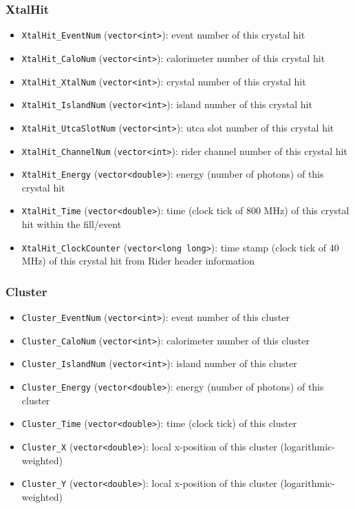 \subsubsection*{XtalHit}
\begin{itemize}
\item \verb+XtalHit_EventNum+ (\verb+vector<int>+): event number of this crystal hit
\item \verb+XtalHit_CaloNum+ (\verb+vector<int>+): calorimeter number of this crystal hit
\item \verb+XtalHit_XtalNum+ (\verb+vector<int>+): crystal number of this crystal hit
\item \verb+XtalHit_IslandNum+ (\verb+vector<int>+): island number of this crystal hit
\item \verb+XtalHit_UtcaSlotNum+ (\verb+vector<int>+): utca slot number of this crystal hit
\item \verb+XtalHit_ChannelNum+ (\verb+vector<int>+): rider channel number of this crystal hit
\item \verb+XtalHit_Energy+ (\verb+vector<double>+): energy (number of photons) of this crystal hit
\item \verb+XtalHit_Time+ (\verb+vector<double>+): time (clock tick of 800 MHz) of this crystal hit within the fill/event
\item \verb+XtalHit_ClockCounter+ (\verb+vector<long long>+): time stamp (clock tick of 40 MHz) of this crystal hit from Rider header information
\end{itemize}


\subsubsection*{Cluster}
\begin{itemize}
\item \verb+Cluster_EventNum+ (\verb+vector<int>+): event number of this cluster 
\item \verb+Cluster_CaloNum+ (\verb+vector<int>+): calorimeter number of this cluster
\item \verb+Cluster_IslandNum+ (\verb+vector<int>+): island number of this cluster
\item \verb+Cluster_Energy+ (\verb+vector<double>+): energy (number of photons) of this cluster
\item \verb+Cluster_Time+ (\verb+vector<double>+): time (clock tick) of this cluster 
\item \verb+Cluster_X+ (\verb+vector<double>+): local x-position of this cluster (logarithmic-weighted)
\item \verb+Cluster_Y+ (\verb+vector<double>+): local x-position of this cluster (logarithmic-weighted)
\end{itemize}

